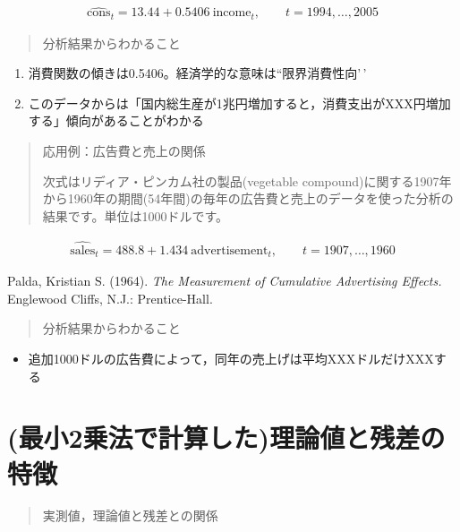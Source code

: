 \documentclass[
]{book}
\providecommand{\tightlist}{%
  \setlength{\itemsep}{0pt}\setlength{\parskip}{0pt}}
\theoremstyle{definition}
\theoremstyle{definition}
\theoremstyle{definition}
\theoremstyle{definition}
\theoremstyle{remark}
\begin{document}
\begin{align*}
\widehat{\text{cons}}_t=13.44+0.5406~\text{income}_t, \qquad t=1994,\dots,2005
\end{align*}

\begin{quote}
分析結果からわかること
\end{quote}

\begin{enumerate}
\def\labelenumi{\arabic{enumi}.}
\tightlist
\item
  消費関数の傾きは0.5406。経済学的な意味は``限界消費性向'\,'
\item
  このデータからは「国内総生産が1兆円増加すると，消費支出がXXX円増加する」傾向があることがわかる
\end{enumerate}

\begin{quote}
応用例：広告費と売上の関係

次式はリディア・ピンカム社の製品(vegetable compound)に関する1907年から1960年の期間(54年間)の毎年の広告費と売上のデータを使った分析の結果です。単位は1000ドルです。
\end{quote}

\begin{align*}
\widehat{\text{sales}}_t=488.8+1.434~\text{advertisement}_t, \qquad t=1907,\dots,1960
\end{align*}

Palda, Kristian S. (1964). \textit{The Measurement of Cumulative Advertising Effects.} Englewood Cliffs, N.J.: Prentice-Hall.

\begin{quote}
分析結果からわかること
\end{quote}

\begin{itemize}
\item 追加1000ドルの広告費によって，同年の売上げは平均XXXドルだけXXXする
\end{itemize}

\hypertarget{ux6700ux5c0f2ux4e57ux6cd5ux3067ux8a08ux7b97ux3057ux305fux7406ux8ad6ux5024ux3068ux6b8bux5deeux306eux7279ux5fb4}{%
\section{(最小2乗法で計算した)理論値と残差の特徴}\label{ux6700ux5c0f2ux4e57ux6cd5ux3067ux8a08ux7b97ux3057ux305fux7406ux8ad6ux5024ux3068ux6b8bux5deeux306eux7279ux5fb4}}

\begin{quote}
実測値，理論値と残差との関係
\end{quote}
\end{document}

